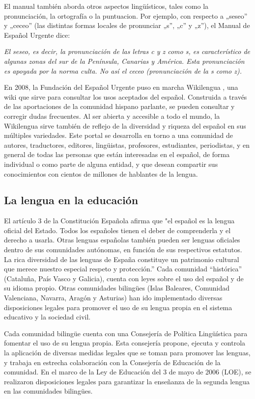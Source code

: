 \begin{multicols}{2}
El manual también aborda otros aspectos lingüísticos, tales como la pronunciación, la ortografía o la puntuacion. Por ejemplo, con respecto a „seseo” y „ceceo” (las distintas formas locales de pronunciar „s”, „c” y „z”), el Manual de Español Urgente dice:

\textit{El seseo, es decir, la pronunciación de las letras c y z como s, es característico de algunas zonas del sur de la Península, Canarias y América. Esta pronunciación es apoyada por la norma culta. No así el ceceo (pronunciación de la s como z).}

En 2008, la Fundación del Español Urgente puso en marcha Wikilengua \cite{wikilengua}, una wiki que sirve para consultar los usos aceptados del español. Construida a través de las aportaciones de la comunidad hispano parlante, se pueden consultar y corregir dudas frecuentes. Al ser abierta y accesible a todo el mundo, la Wikilengua sirve también de reflejo de la diversidad y riqueza del español en sus múltiples variedades. Este portal se  desarrolla en torno a una comunidad de autores, traductores, editores, lingüistas, profesores, estudiantes, periodistas, y en general de todas las personas que están interesadas en el español, de forma individual o como parte de alguna entidad, y que desean compartir sus conocimientos con cientos de millones de hablantes de la lengua.

\subsection{La lengua en la educación}

El artículo 3 de la Constitución Española afirma que "el español es la lengua oficial del Estado. Todos los españoles tienen el deber de comprenderla y el derecho a usarla. Otras lenguas españolas también pueden ser  lenguas oficiales dentro de sus  comunidades autónomas, en función de sus respectivos estatutos. La rica diversidad de las lenguas de España constituye un patrimonio cultural que merece nuestro especial respeto y protección.” Cada comunidad “histórica” (Cataluña, País Vasco y Galicia), cuenta con leyes sobre el uso del español y de su idioma propio. Otras comunidades bilingües (Islas Baleares, Comunidad Valenciana, Navarra, Aragón y Asturias) han ido implementado diversas disposiciones legales para promover el uso de su lengua propia en el sistema educativo y la sociedad civil.

Cada comunidad bilingüe cuenta con una Consejería de Política Lingüística para fomentar el uso de su lengua propia. Esta consejería propone, ejecuta y controla la aplicación de diversas medidas legales que se toman para promover las lenguas, y trabaja en estrecha colaboración con la Consejería de Educación de la comunidad. En el marco de la Ley de Educación del 3 de mayo de 2006 (LOE), se realizaron  disposiciones legales para garantizar la enseñanza de la segunda lengua en las comunidades bilingües.


\end{multicols}
